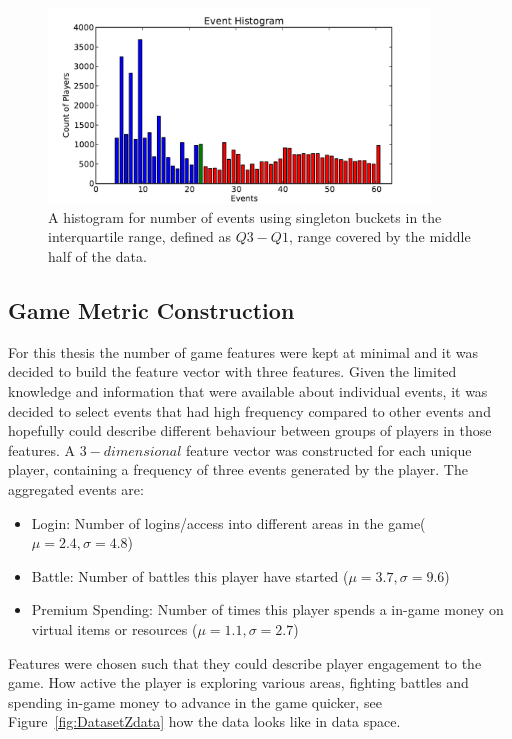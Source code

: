 \begin{figure}[here]
\centerline{\includegraphics[width=0.9\textwidth]{Figures/histogram_events_iqr.pdf}}
\caption{A histogram for number of events using singleton buckets in the interquartile range, defined as $Q3 - Q1$, range covered by the middle half of the data.}
\label{fig:histogram_events_iqr}
\end{figure}


\subsection{Game Metric Construction}
\label{gamemetric}
For this thesis the number of game features were kept at minimal and it was decided to build the feature vector with three features. Given the limited knowledge and information that were available about individual events, it was decided to select events that had high frequency compared to other events and hopefully could describe different behaviour between groups of players in those features. A $3-dimensional$ feature vector was constructed for each unique player, containing a frequency of three events generated by the player. The aggregated events are:
\begin{itemize}
\item Login: Number of logins/access into different areas in the game($\mu = 2.4, \sigma = 4.8$)
\item Battle: Number of battles this player have started ($\mu = 3.7, \sigma = 9.6$)
\item Premium Spending: Number of times this player spends a in-game money on virtual items or resources ($\mu = 1.1, \sigma = 2.7$) 
\end{itemize}

Features were chosen such that they could describe player engagement to the game. How active the player is exploring various areas, fighting battles and spending in-game money to advance in the game quicker, see Figure~\ref{fig:DatasetZdata} how the data looks like in data space. 

